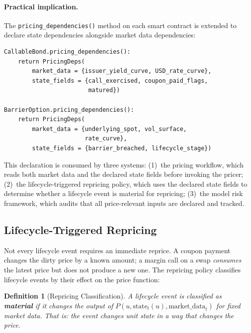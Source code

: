\documentclass[11pt,a4paper]{article}
\newtheorem{definition}{Definition}[section]
\begin{document}
\paragraph{Practical implication.}  The \texttt{pricing\_dependencies()} method on each smart contract is extended to declare state dependencies alongside market data dependencies:

\begin{lstlisting}
CallableBond.pricing_dependencies():
    return PricingDeps(
        market_data = {issuer_yield_curve, USD_rate_curve},
        state_fields = {call_exercised, coupon_paid_flags,
                        matured})

BarrierOption.pricing_dependencies():
    return PricingDeps(
        market_data = {underlying_spot, vol_surface,
                       rate_curve},
        state_fields = {barrier_breached, lifecycle_stage})
\end{lstlisting}

\noindent This declaration is consumed by three systems: (1)~the pricing workflow, which reads both market data and the declared state fields before invoking the pricer; (2)~the lifecycle-triggered repricing policy, which uses the declared state fields to determine whether a lifecycle event is material for repricing; (3)~the model risk framework, which audits that all price-relevant inputs are declared and tracked.

\subsection{Lifecycle-Triggered Repricing}
\label{sec:lifecycle-repricing}

Not every lifecycle event requires an immediate reprice.  A coupon payment changes the dirty price by a known amount; a margin call on a swap \emph{consumes} the latest price but does not produce a new one.  The repricing policy classifies lifecycle events by their effect on the price function:

\begin{definition}[Repricing Classification]
\label{def:repricing-class}
A lifecycle event is classified as \textbf{material} if it changes the output of $P(u, \mathrm{state}_t(u), \mathrm{market\_data}_t)$ for fixed market data.  That is: the event changes unit state in a way that changes the price.
\end{definition}
\end{document}

